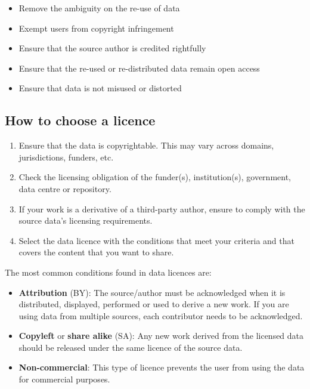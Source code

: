 \documentclass[
]{book}
\providecommand{\tightlist}{%
  \setlength{\itemsep}{0pt}\setlength{\parskip}{0pt}}
\begin{document}
\begin{itemize}
\tightlist
\item
  Remove the ambiguity on the re-use of data
\item
  Exempt users from copyright infringement
\item
  Ensure that the source author is credited rightfully
\item
  Ensure that the re-used or re-distributed data remain open access
\item
  Ensure that data is not misused or distorted
\end{itemize}

\hypertarget{how-to-choose-a-licence}{%
\subsection*{How to choose a licence}\label{how-to-choose-a-licence}}

\begin{enumerate}
\def\labelenumi{\arabic{enumi}.}
\tightlist
\item
  Ensure that the data is copyrightable. This may vary across domains, jurisdictions, funders, etc.
\item
  Check the licensing obligation of the funder(s), institution(s), government, data centre or repository.
\item
  If your work is a derivative of a third-party author, ensure to comply with the source data's licensing requirements.
\item
  Select the data licence with the conditions that meet your criteria and that covers the content that you want to share.
\end{enumerate}

The most common conditions found in data licences are:

\begin{itemize}
\tightlist
\item
  \textbf{Attribution} (BY): The source/author must be acknowledged when it is distributed, displayed, performed or used to derive a new work. If you are using data from multiple sources, each contributor needs to be acknowledged.
\item
  \textbf{Copyleft} or \textbf{share alike} (SA): Any new work derived from the licensed data should be released under the same licence of the source data.
\item
  \textbf{Non-commercial}: This type of licence prevents the user from using the data for commercial purposes.
\end{itemize}
\end{document}
